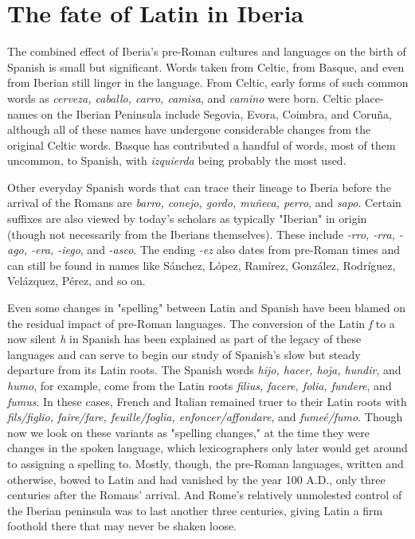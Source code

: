 \section{The fate of Latin in Iberia}

The combined effect of Iberia's pre-Roman cultures and languages on the birth of Spanish is small but significant. Words taken
from Celtic, from Basque, and even from Iberian still linger in the language. From Celtic, early forms of such common words as \emph{cerveza, caballo, carro, camisa}, and \emph{camino} were born. Celtic place-names on
the Iberian Peninsula include Segovia, Evora, Coimbra, and Coruña, although all of these names have undergone considerable changes from
the original Celtic words. Basque has contributed a handful of words,
most of them uncommon, to Spanish, with \emph{izquierda} being probably
the most used.

Other everyday Spanish words that can trace their lineage to
Iberia before the arrival of the Romans are \emph{barro, conejo, gordo, muñeca, perro}, and \emph{sapo}. Certain suffixes are also viewed by today's scholars as typically "Iberian" in origin (though not necessarily from the
Iberians themselves). These include \emph{-rro, -rra, -ago, -era, -iego}, and
\emph{-asco}. The ending \emph{-ez} also dates from pre-Roman times and can still
be found in names like Sánchez, López, Ramírez, González, Rodríguez,
Velázquez, Pérez, and so on.

Even some changes in "spelling" between Latin and Spanish
have been blamed on the residual impact of pre-Roman languages. The
conversion of the Latin \emph{f} to a now silent \emph{h} in Spanish has been explained as part of the legacy of these languages and can serve to begin
our study of Spanish's slow but steady departure from its Latin roots.
The Spanish words \emph{hijo, hacer, hoja, hundir}, and \emph{humo}, for example,
come from the Latin roots \emph{filius, facere, folia, fundere}, and \emph{fumus}. In
these cases, French and Italian remained truer to their Latin roots with
\emph{fils/figlio, faire/fare, feuille/foglia, enfoncer/affondare}, and \emph{fumeé/fumo}. Though now we look on these variants as "spelling changes," at
the time they were changes in the spoken language, which lexicographers
only later would get around to assigning a spelling to. Mostly, though,
the pre-Roman languages, written and otherwise, bowed to Latin and
had vanished by the year 100 A.D., only three centuries after the Romans' arrival. And Rome's relatively unmolested control of the Iberian
peninsula was to last another three centuries, giving Latin a firm foothold there that may never be shaken loose.

